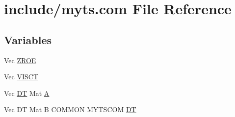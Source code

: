 \hypertarget{myts_8com}{\section{include/myts.com File Reference}
\label{myts_8com}
}
\subsection*{Variables}
\begin{DoxyCompactItemize}
\item 
Vec \hyperlink{myts_8com_a0c4fbcdb78e6b50c8919d714e4b5a694}{Z\-R\-O\-E}
\item 
Vec \hyperlink{myts_8com_accf7addb2159476a2ff0ba7d99b8bbbc}{V\-I\-S\-C\-T}
\item 
Vec \hyperlink{myts_8com_a41549d5ede5e2b840495daf35608da41}{D\-T} Mat \hyperlink{myts_8com_a04f74f75c95694d7f2517b1ad1bb88fc}{A}
\item 
Vec D\-T Mat B C\-O\-M\-M\-O\-N M\-Y\-T\-S\-C\-O\-M \hyperlink{myts_8com_a41549d5ede5e2b840495daf35608da41}{D\-T}
\end{DoxyCompactItemize}


